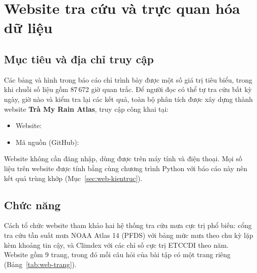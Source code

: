 \section{Website tra cứu và trực quan hóa dữ liệu}
\label{sec:website}

\subsection{Mục tiêu và địa chỉ truy cập}

Các bảng và hình trong báo cáo chỉ trình bày được một số giá trị tiêu biểu, trong khi chuỗi số liệu gồm 87\,672 giờ quan trắc. Để người đọc có thể tự tra cứu bất kỳ ngày, giờ nào và kiểm tra lại các kết quả, toàn bộ phân tích được xây dựng thành website \textbf{Trà My Rain Atlas}, truy cập công khai tại:

\begin{itemize}[leftmargin=1.5cm]
  \item Website: \WebURL
  \item Mã nguồn (GitHub): \GitHubURL
\end{itemize}

Website không cần đăng nhập, dùng được trên máy tính và điện thoại. Mọi số liệu trên website được tính bằng cùng chương trình Python với báo cáo này nên kết quả trùng khớp (Mục~\ref{sec:web-kientruc}).

\subsection{Chức năng}

Cách tổ chức website tham khảo hai hệ thống tra cứu mưa cực trị phổ biến: cổng tra cứu tần suất mưa NOAA Atlas 14 (PFDS) \cite{pfds} với bảng mức mưa theo chu kỳ lặp kèm khoảng tin cậy, và Climdex \cite{climdex} với các chỉ số cực trị ETCCDI theo năm. Website gồm 9 trang, trong đó mỗi câu hỏi của bài tập có một trang riêng (Bảng~\ref{tab:web-trang}).

